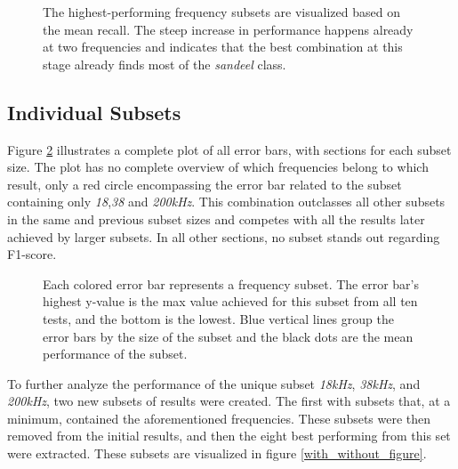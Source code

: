         \clearpage
        \begin{figure}[H]
            \centering
            
            \caption[Best frequency combination - Recall]{The highest-performing frequency subsets are visualized based on the mean recall. The steep increase in performance happens already at two frequencies and indicates that the best combination at this stage already finds most of the \textit{sandeel} class.}
          	\medskip 
            \label{increasing_freq_recall_score_fig}
        \end{figure}

    \subsection{Individual Subsets}
        Figure \ref{errorbar_fig} illustrates a complete plot of all error bars, with sections for each subset size. The plot has no complete overview of which frequencies belong to which result, only a red circle encompassing the error bar related to the subset containing only \textit{18},\textit{38} and \textit{200kHz}. This combination outclasses all other subsets in the same and previous subset sizes and competes with all the results later achieved by larger subsets. In all other sections, no subset stands out regarding F1-score.
        \clearpage
        \begin{figure}[H]
            \centering
                        
            \caption[Error bars per combination]{Each colored error bar represents a frequency subset. The error bar's highest y-value is the max value achieved for this subset from all ten tests, and the bottom is the lowest. Blue vertical lines group the error bars by the size of the subset and the black dots are the mean performance of the subset.}
          	\medskip 
            \label{errorbar_fig}
        \end{figure}
    
        To further analyze the performance of the unique subset \textit{18kHz}, \textit{38kHz}, and \textit{200kHz}, two new subsets of results were created. The first with subsets that, at a minimum, contained the aforementioned frequencies. These subsets were then removed from the initial results, and then the eight best performing from this set were extracted. These subsets are visualized in figure \ref{with_without_figure}.
        
